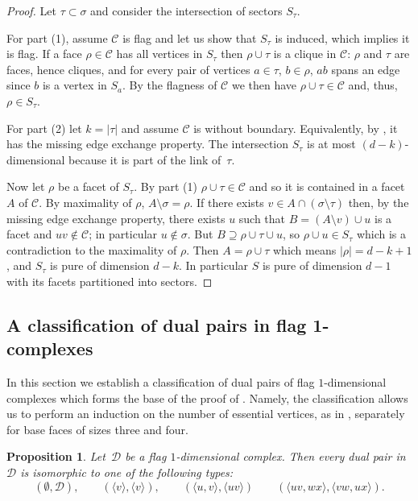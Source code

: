 \documentclass[a4paper,12pt]{amsart}
\theoremstyle{plain}
\newtheorem{proposition}[theorem]{Proposition}
\theoremstyle{definition}
\newcommand{\C}{\mathcal C}
\newcommand{\D}{\mathcal D}
\newcommand{\facetA}{A}
\newcommand{\facetB}{B}
\newcommand{\face}{\sigma}
\newcommand{\smallface}{\tau}
\begin{document}
\begin{proof}
Let $\smallface\subset \face$ and consider the intersection of sectors $S_\smallface$.

For part (1), assume $\C$ is flag and let us show that $S_\smallface$ is induced, which implies it is flag. If a face $\rho \in \C$ has all vertices in $S_{\smallface}$ then $\rho \cup \smallface$ is a clique in $\C$: $\rho$ and $\tau$ are faces, hence cliques, and for every pair of vertices $a\in\tau$, $b \in \rho$, $ab$ spans an edge since $b$ is a vertex in $S_a$. By the flagness of $\C$ we then have $\rho \cup \smallface \in \C$ and, thus, $\rho \in S_{\smallface}$.

  For part (2) let $k=|\smallface|$ and assume $\C$ is without boundary. Equivalently, by , it has the missing edge exchange property.
  The intersection $S_\smallface$ is at most $(d-k)$-dimensional because it is part of the link of~$\smallface$. 

  Now let $\rho$ be a facet of $S_{\smallface}$. 
	By part (1) $\rho\cup \smallface \in \C$ and so it is contained in a facet $\facetA$ of $\C$. 
	By maximality of $\rho$, $\facetA\setminus \face = \rho$. If there exists $v\in \facetA\cap(\face\setminus\smallface)$ then, by the missing edge exchange property, there exists $u$ such that $\facetB = (\facetA\setminus v)\cup u$ is a facet and
$uv\notin \C$; in particular $u\notin\face$. 
	But $\facetB \supseteq \rho\cup\smallface\cup u$, so $\rho\cup u \in S_{\smallface}$ which is a contradiction to the maximality of $\rho$. 
	Then $\facetA = \rho\cup\smallface$ which means $|\rho| = d-k+1$, and $S_{\smallface}$ is pure of dimension $d-k$. 
	In particular $S$ is pure of dimension $d-1$ with its facets partitioned into sectors.	
 \end{proof}


\subsection{A classification of dual pairs in flag 1-complexes}
\label{ssec:flag1cmplxs}

In this section we establish a classification of dual pairs of flag $1$-dimensional complexes which forms the base of the proof of . Namely, the classification allows us to perform an induction on the number of essential vertices, as in , separately for base faces of sizes three and four.

\begin{proposition}
\label{lem:1dflag}
  Let~$\D$ be a flag $1$-dimensional complex.
  Then every dual pair in~$\D$ is isomorphic to one of the following types:
  \[
    (\emptyset, \D),\qquad (\langle v\rangle, \langle v\rangle), \qquad
    (\langle u,v\rangle, \langle uv\rangle) \qquad (\langle uv,wx\rangle,\langle vw,ux\rangle).
  \]
\end{proposition}
\end{document}
